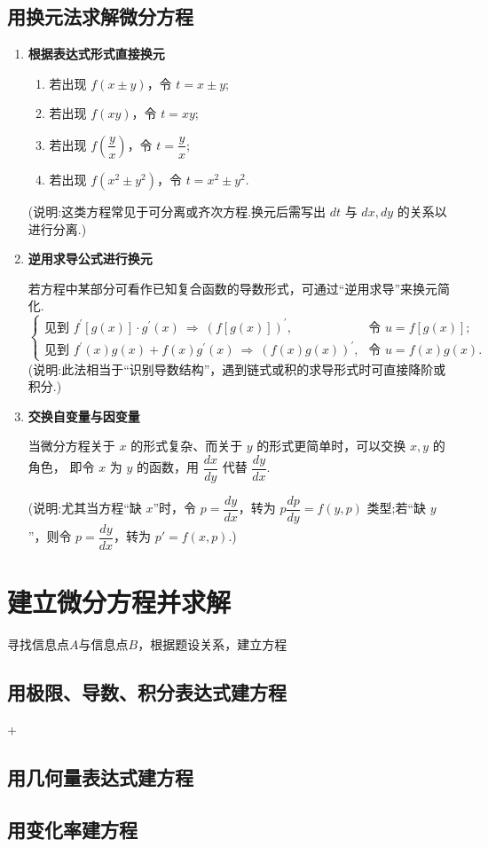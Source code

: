 \subsection{用换元法求解微分方程}

\DTwoThree
\begin{enumerate}
    \item \textbf{根据表达式形式直接换元}
          \begin{enumerate}
              \item 若出现 $f(x\pm y)$，令 $t = x \pm y$;
              \item 若出现 $f(xy)$，令 $t = xy$;
              \item 若出现 $f\!\left(\dfrac{y}{x}\right)$，令 $t = \dfrac{y}{x}$;
              \item 若出现 $f(x^{2}\pm y^{2})$，令 $t = x^{2} \pm y^{2}$.
          \end{enumerate}
          (说明:这类方程常见于可分离或齐次方程.换元后需写出 $dt$ 与 $dx,dy$ 的关系以进行分离.)

    \item \textbf{逆用求导公式进行换元}

          若方程中某部分可看作已知复合函数的导数形式，可通过“逆用求导”来换元简化.
          \[
              \begin{cases}
                  \text{见到 } f^{\prime}[g(x)] \cdot g^{\prime}(x) \ \Rightarrow \ \left(f[g(x)]\right)^{\prime},      & \text{令 } u = f[g(x)];   \\
                  \text{见到 } f^{\prime}(x) g(x) + f(x) g^{\prime}(x) \ \Rightarrow \ \left(f(x) g(x)\right)^{\prime}, & \text{令 } u = f(x) g(x).
              \end{cases}
          \]
          (说明:此法相当于“识别导数结构”，遇到链式或积的求导形式时可直接降阶或积分.)

    \item \textbf{交换自变量与因变量}

          当微分方程关于 $x$ 的形式复杂、而关于 $y$ 的形式更简单时，可以交换 $x,y$ 的角色，
          即令 $x$ 为 $y$ 的函数，用 $\dfrac{dx}{dy}$ 代替 $\dfrac{dy}{dx}$.

          (说明:尤其当方程“缺 $x$”时，令 $p = \dfrac{dy}{dx}$，转为 $p\dfrac{dp}{dy} = f(y,p)$ 类型;若“缺 $y$”，则令 $p = \dfrac{dy}{dx}$，转为 $p' = f(x,p)$.)
\end{enumerate}

\section{建立微分方程并求解}
寻找信息点$A$与信息点$B$，根据题设关系，建立方程

\DThree
\subsection{用极限、导数、积分表达式建方程}
\DTwoTwo+\DThree
\subsection{用几何量表达式建方程}
\DThree
\subsection{用变化率建方程}
\DThree


